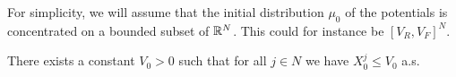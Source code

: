 For simplicity, we will assume that the initial distribution \( \mu_0 \) of the potentials is concentrated on a bounded subset of \( \mathbb{R}^N \).
This could for instance be \( [V_R, V_F]^N \).

\begin{assumption}\label{assum:X0-bounded}
  There exists a constant \( V_0 > 0 \) such that for all \( j \in N \) we have \( X_0^j \leq V_0 \) a.s.
\end{assumption}





